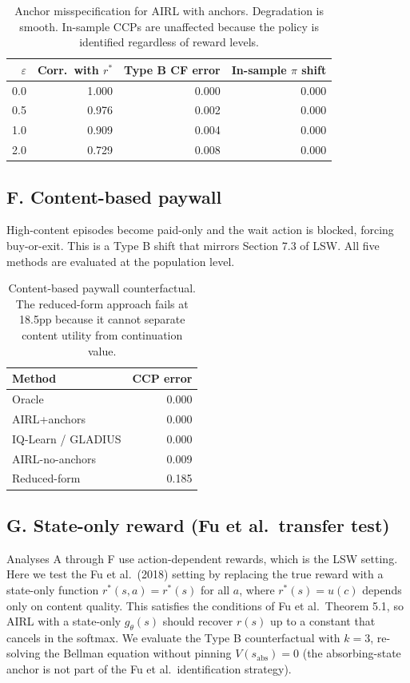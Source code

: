 \documentclass[11pt]{article}
\begin{document}
\begin{table}[H]
\centering
\begin{tabular}{rrrr}
\toprule
$\varepsilon$ & Corr.\ with $r^*$ & Type B CF error & In-sample $\pi$ shift \\
\midrule
0.0 & 1.000 & 0.000 & 0.000 \\
0.5 & 0.976 & 0.002 & 0.000 \\
1.0 & 0.909 & 0.004 & 0.000 \\
2.0 & 0.729 & 0.008 & 0.000 \\
\bottomrule
\end{tabular}
\caption{Anchor misspecification for AIRL with anchors. Degradation is smooth. In-sample CCPs are unaffected because the policy is identified regardless of reward levels.}
\label{tab:misspec}
\end{table}

\subsection{F. Content-based paywall}

High-content episodes become paid-only and the wait action is blocked, forcing buy-or-exit. This is a Type B shift that mirrors Section 7.3 of LSW. All five methods are evaluated at the population level.

\begin{table}[H]
\centering
\begin{tabular}{lr}
\toprule
Method & CCP error \\
\midrule
Oracle & 0.000 \\
AIRL+anchors & 0.000 \\
IQ-Learn / GLADIUS & 0.000 \\
AIRL-no-anchors & 0.009 \\
Reduced-form & 0.185 \\
\bottomrule
\end{tabular}
\caption{Content-based paywall counterfactual. The reduced-form approach fails at 18.5pp because it cannot separate content utility from continuation value.}
\label{tab:paywall}
\end{table}

\subsection{G. State-only reward (Fu et al.\ transfer test)}

Analyses A through F use action-dependent rewards, which is the LSW setting. Here we test the Fu et al.\ (2018) setting by replacing the true reward with a state-only function $r^*(s,a) = r^*(s)$ for all $a$, where $r^*(s) = u(c)$ depends only on content quality. This satisfies the conditions of Fu et al.\ Theorem 5.1, so AIRL with a state-only $g_\theta(s)$ should recover $r(s)$ up to a constant that cancels in the softmax. We evaluate the Type B counterfactual with $k = 3$, re-solving the Bellman equation without pinning $V(s_{\mathrm{abs}}) = 0$ (the absorbing-state anchor is not part of the Fu et al.\ identification strategy).
\end{document}
